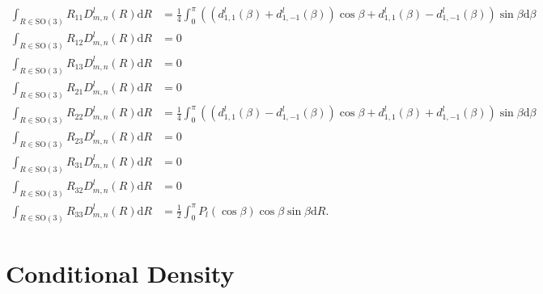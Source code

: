 \documentclass[10pt]{article}
\newcommand{\SO}{\ensuremath{\mathrm{SO}(3)}}
\newcommand{\diff}[1]{\mathrm{d}#1}
\begin{document}
\begin{align*}
	\int_{R\in\SO} R_{11}D^l_{m,n}(R) \diff{R} &= \frac{1}{4} \int_0^\pi \left( \left(d^l_{1,1}(\beta) + d^l_{1,-1}(\beta)\right)\cos\beta + d^l_{1,1}(\beta) - d^l_{1,-1}(\beta) \right) \sin\beta \diff{\beta}  \\
	\int_{R\in\SO} R_{12}D^l_{m,n}(R) \diff{R} &= 0 \\
	\int_{R\in\SO} R_{13}D^l_{m,n}(R) \diff{R} &= 0 \\
	\int_{R\in\SO} R_{21}D^l_{m,n}(R) \diff{R} &= 0 \\
	\int_{R\in\SO} R_{22}D^l_{m,n}(R) \diff{R} &= \frac{1}{4} \int_0^\pi \left( \left(d^l_{1,1}(\beta) - d^l_{1,-1}(\beta)\right)\cos\beta + d^l_{1,1}(\beta) + d^l_{1,-1}(\beta) \right) \sin\beta \diff{\beta} \\
	\int_{R\in\SO} R_{23}D^l_{m,n}(R) \diff{R} &= 0 \\
	\int_{R\in\SO} R_{31}D^l_{m,n}(R) \diff{R} &= 0 \\
	\int_{R\in\SO} R_{32}D^l_{m,n}(R) \diff{R} &= 0 \\
	\int_{R\in\SO} R_{33}D^l_{m,n}(R) \diff{R} &= \frac{1}{2} \int_0^\pi P_l(\cos\beta) \cos\beta \sin\beta \diff{R}.
\end{align*}

\section{Conditional Density}
\end{document}
